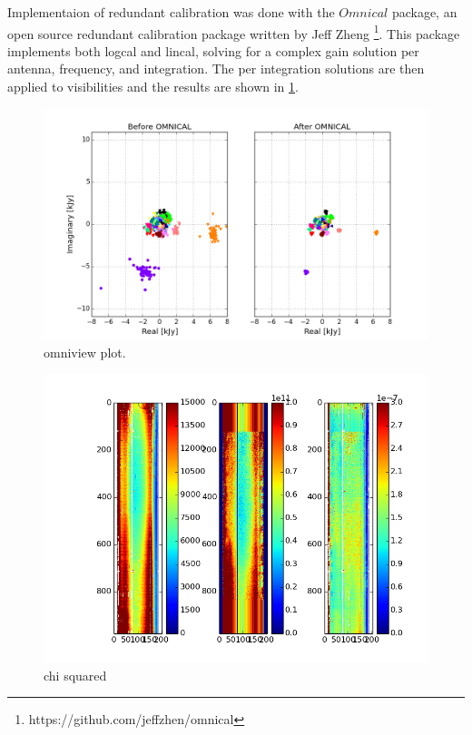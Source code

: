 \documentclass[twocolumn,numberedappendix]{emulateapj} \shorttitle{PSA64}
\begin{document}
%    
%       

Implementaion of redundant calibration was done with the ${Omnical}$ package, an
open source redundant calibration package written by Jeff Zheng
\footnote{https://github.com/jeffzhen/omnical}\cite{zheng_et_al2014}. This
package implements both logcal and lincal, solving for a complex gain solution
per antenna, frequency, and integration. The per integration solutions are then
applied to visibilities and the results are shown in \ref{fig:omniview}.

\begin{figure}
\centering
\includegraphics[width=2\columnwidth]{plots/omniview_64.png}
\caption{omniview plot.}
\label{fig:omniview}
\end{figure}

\begin{figure}
\centering
\includegraphics[width=\columnwidth]{plots/august_chi2.png}
\caption{chi squared}
\label{fig:chi2}
\end{figure}
\end{document}
